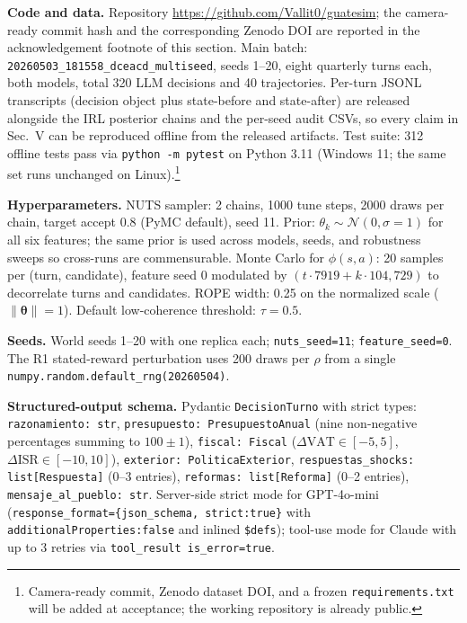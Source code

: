 \documentclass[conference]{IEEEtran}
\begin{document}
\textbf{Code and data.} Repository
\url{https://github.com/Vallit0/guatesim}; the camera-ready commit
hash and the corresponding Zenodo DOI are reported in the
acknowledgement footnote of this section. Main batch:
\texttt{20260503\_181558\_dceacd\_multiseed}, seeds 1--20, eight
quarterly turns each, both models, total 320 LLM decisions and 40
trajectories. Per-turn JSONL transcripts (decision object plus
state-before and state-after) are released alongside the IRL
posterior chains and the per-seed audit CSVs, so every claim in
Sec.~V can be reproduced offline from the released artifacts. Test
suite: 312 offline tests pass via \texttt{python -m pytest} on
Python 3.11 (Windows 11; the same set runs unchanged on Linux).\footnote{Camera-ready
commit, Zenodo dataset DOI, and a frozen \texttt{requirements.txt}
will be added at acceptance; the working repository is already
public.}

\textbf{Hyperparameters.} NUTS sampler: 2 chains, 1000 tune steps,
2000 draws per chain, target accept 0.8 (PyMC default), seed 11.
Prior: $\theta_k \sim \mathcal{N}(0, \sigma{=}1)$ for all six
features; the same prior is used across models, seeds, and
robustness sweeps so cross-runs are commensurable. Monte Carlo for
$\phi(s,a)$: 20 samples per (turn, candidate), feature seed 0
modulated by $(t \cdot 7919 + k \cdot 104{,}729)$ to decorrelate
turns and candidates. ROPE width: 0.25 on the normalized scale
($\|\boldsymbol{\theta}\|{=}1$). Default low-coherence threshold:
$\tau{=}0.5$.

\textbf{Seeds.} World seeds 1--20 with one replica each;
\texttt{nuts\_seed{=}11}; \texttt{feature\_seed{=}0}. The R1
stated-reward perturbation uses 200 draws per $\rho$ from a single
\texttt{numpy.random.default\_rng(20260504)}.

\textbf{Structured-output schema.} Pydantic \texttt{DecisionTurno}
with strict types: \texttt{razonamiento: str}, \texttt{presupuesto:
PresupuestoAnual} (nine non-negative percentages summing to
$100\pm1$), \texttt{fiscal: Fiscal} ($\Delta\text{VAT} \in [-5,5]$,
$\Delta\text{ISR} \in [-10,10]$), \texttt{exterior:
PoliticaExterior}, \texttt{respuestas\_shocks: list[Respuesta]}
(0--3 entries), \texttt{reformas: list[Reforma]} (0--2 entries),
\texttt{mensaje\_al\_pueblo: str}. Server-side strict mode for
GPT-4o-mini (\texttt{response\_format=\{json\_schema, strict:true\}}
with \texttt{additionalProperties:false} and inlined \texttt{\$defs});
tool-use mode for Claude with up to 3 retries via
\texttt{tool\_result is\_error{=}true}.
\end{document}
